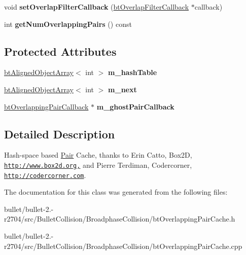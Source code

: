 \begin{DoxyCompactItemize}
\item 
\hypertarget{classbt_hashed_overlapping_pair_cache_a9af1a20fd2d8c1d28423114760a72aa1}{void {\bfseries set\+Overlap\+Filter\+Callback} (\hyperlink{structbt_overlap_filter_callback}{bt\+Overlap\+Filter\+Callback} $\ast$callback)}\label{classbt_hashed_overlapping_pair_cache_a9af1a20fd2d8c1d28423114760a72aa1}

\item 
\hypertarget{classbt_hashed_overlapping_pair_cache_ac18b70a1c5ea9f1007e8dc0fc208f0c1}{int {\bfseries get\+Num\+Overlapping\+Pairs} () const }\label{classbt_hashed_overlapping_pair_cache_ac18b70a1c5ea9f1007e8dc0fc208f0c1}

\end{DoxyCompactItemize}
\subsection*{Protected Attributes}
\begin{DoxyCompactItemize}
\item 
\hypertarget{classbt_hashed_overlapping_pair_cache_ac071df80073cddd338ef5327a19f398f}{\hyperlink{classbt_aligned_object_array}{bt\+Aligned\+Object\+Array}$<$ int $>$ {\bfseries m\+\_\+hash\+Table}}\label{classbt_hashed_overlapping_pair_cache_ac071df80073cddd338ef5327a19f398f}

\item 
\hypertarget{classbt_hashed_overlapping_pair_cache_a2d966f0e1420667e5e3257f9ba6b95e6}{\hyperlink{classbt_aligned_object_array}{bt\+Aligned\+Object\+Array}$<$ int $>$ {\bfseries m\+\_\+next}}\label{classbt_hashed_overlapping_pair_cache_a2d966f0e1420667e5e3257f9ba6b95e6}

\item 
\hypertarget{classbt_hashed_overlapping_pair_cache_ad1ec72194e97b9142c511ca46312fb74}{\hyperlink{classbt_overlapping_pair_callback}{bt\+Overlapping\+Pair\+Callback} $\ast$ {\bfseries m\+\_\+ghost\+Pair\+Callback}}\label{classbt_hashed_overlapping_pair_cache_ad1ec72194e97b9142c511ca46312fb74}

\end{DoxyCompactItemize}


\subsection{Detailed Description}
Hash-\/space based \hyperlink{struct_pair}{Pair} Cache, thanks to Erin Catto, Box2\+D, \href{http://www.box2d.org,}{\tt http\+://www.\+box2d.\+org,} and Pierre Terdiman, Codercorner, \href{http://codercorner.com}{\tt http\+://codercorner.\+com}. 

The documentation for this class was generated from the following files\+:\begin{DoxyCompactItemize}
\item 
bullet/bullet-\/2.-\/r2704/src/\+Bullet\+Collision/\+Broadphase\+Collision/bt\+Overlapping\+Pair\+Cache.\+h\item 
bullet/bullet-\/2.-\/r2704/src/\+Bullet\+Collision/\+Broadphase\+Collision/bt\+Overlapping\+Pair\+Cache.\+cpp\end{DoxyCompactItemize}
